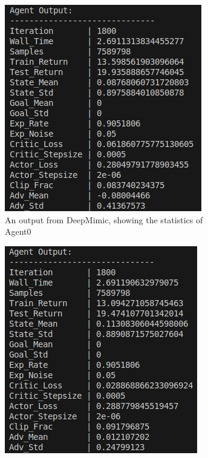 \documentclass{l4proj}
\begin{document}
\begin{figure}
  \begin{subfigure}[b]{0.45\textwidth}
    \includegraphics[width=\textwidth]{images/multiple_agent0_1.png}
    \caption{An output from DeepMimic, showing the statistics of Agent0}
    \label{fig:earlymultipletrainingresults1}
  \end{subfigure}
  \begin{subfigure}[b]{0.45\textwidth}
    \includegraphics[width=\textwidth]{images/multiple_agent1_1.png}

\end{subfigure}
\end{figure}
\end{document}
